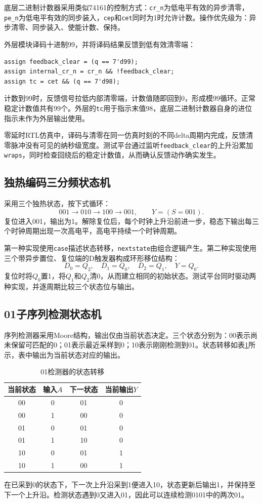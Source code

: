 \documentclass[12pt,a4paper]{ctexart}
\begin{document}
底层二进制计数器采用类似74161的控制方式：\texttt{cr\_n}为低电平有效的异步清零，\texttt{pe\_n}为低电平有效的同步装入，\texttt{cep}和\texttt{cet}同时为1时允许计数。操作优先级为：异步清零、同步装入、使能计数、保持。

外层模块译码十进制99，并将译码结果反馈到低有效清零端：
\begin{lstlisting}
assign feedback_clear = (q == 7'd99);
assign internal_cr_n = cr_n && !feedback_clear;
assign tc = cet && (q == 7'd98);
\end{lstlisting}
计数到99时，反馈信号拉低内部清零端，计数值随即回到0，形成模99循环。正常稳定计数值共有99个。外层的\texttt{tc}用于指示末值98，底层二进制计数器自身的进位指示未作为外层输出使用。

零延时RTL仿真中，译码与清零在同一仿真时刻的不同delta周期内完成，反馈清零脉冲没有可见的纳秒级宽度。测试平台通过监听\texttt{feedback\_clear}的上升沿累加\texttt{wraps}，同时检查回绕后的稳定计数值，从而确认反馈动作确实发生。

\subsection{独热编码三分频状态机}
采用三个独热状态，按下式循环：
\begin{equation}
001\longrightarrow010\longrightarrow100\longrightarrow001,
\qquad Y=(S=001).
\end{equation}
复位进入001，输出为1。解除复位后，每个时钟上升沿前进一步，稳态下输出每三个时钟周期出现一次高电平，高电平持续一个时钟周期。

第一种实现使用\texttt{case}描述状态转移，\texttt{nextstate}由组合逻辑产生。第二种实现使用三个带异步置位、复位端的D触发器构成环形移位结构：
\begin{equation}
D_0=Q_2,\quad D_1=Q_0,\quad D_2=Q_1,\quad Y=Q_0.
\end{equation}
复位时将$Q_0$置1，将$Q_1$和$Q_2$清0，从而建立相同的初始状态。测试平台同时驱动两种实现，并逐周期比较三个状态位与输出。

\subsection{01子序列检测状态机}
序列检测器采用Moore结构，输出仅由当前状态决定。三个状态分别为：00表示尚未保留可匹配的0；01表示最近采样到0；10表示刚刚检测到01。状态转移如表\ref{tab:detect}所示，表中输出为当前状态对应的输出。
\begin{table}[H]
\centering
\caption{01检测器的状态转移}
\label{tab:detect}
\begin{tabular}{cccc}
\toprule
当前状态 & 输入$A$ & 下一状态 & 当前输出$Y$\\
\midrule
00 & 0 & 01 & 0\\
00 & 1 & 00 & 0\\
01 & 0 & 01 & 0\\
01 & 1 & 10 & 0\\
10 & 0 & 01 & 1\\
10 & 1 & 00 & 1\\
\bottomrule
\end{tabular}
\end{table}
在已采到0的状态下，下一次上升沿采到1便进入10，状态更新后输出1，并保持至下一个上升沿。检测状态遇到0又进入01，因此可以连续检测0101中的两次01。
\end{document}
